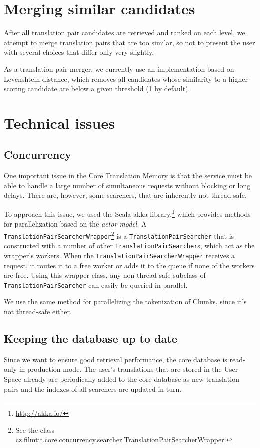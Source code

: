 \section{Merging similar candidates}

After all translation pair candidates are retrieved and ranked on each level, we attempt to merge translation pairs that are too similar, so not to present the user with several choices that differ only very slightly.

As a translation pair merger, we currently use an implementation based on Levenshtein distance, which removes all candidates whose similarity to a higher-scoring candidate are below a given threshold (1 by default).




\section{Technical issues}

\subsection{Concurrency}

One important issue in the Core Translation Memory is that the service must be able to handle a large number of simultaneous requests without blocking or long delays. There are, however, some searchers, that are inherently not thread-safe.

To approach this issue, we used the Scala akka library,\footnote{\url{http://akka.io/}} which provides methods for parallelization based on the \emph{actor model}. A {\tt TranslationPairSearcherWrapper}\footnote{See  the class cz.filmtit.core.concurrency.searcher.TranslationPairSearcherWrapper.} is a {\tt TranslationPairSearcher} that is constructed with a number of other {\tt TranslationPairSearcher}s, which act as the wrapper's workers. When the {\tt TranslationPairSearcherWrapper} receives a request, it routes it to a free worker or adds it to the queue if none of the workers are free. Using this wrapper class, any non-thread-safe subclass of {\tt TranslationPairSearcher} can easily be queried in parallel.

We use the same method for parallelizing the tokenization of Chunks, since it's not thread-safe either.


\subsection{Keeping the database up to date}

Since we want to ensure good retrieval performance, the core database is read-only in production mode. The user's translations that are stored in the User Space already are periodically added to the core database as new translation pairs and the indexes of all searchers are updated in turn.



